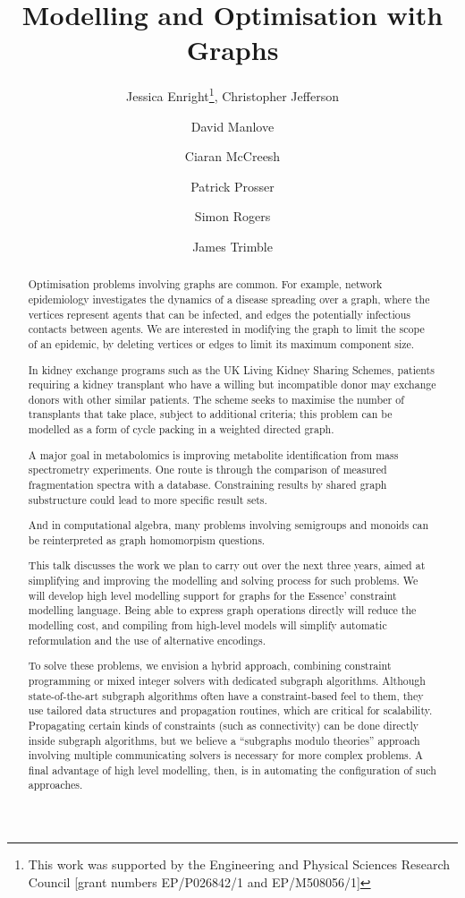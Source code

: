 \documentclass{llncs}
\title{Modelling and Optimisation with Graphs}
\author{
    Jessica Enright\inst{1}\thanks{This work was supported by the Engineering and Physical Sciences
    Research Council [grant numbers EP/P026842/1 and EP/M508056/1]},
    Christopher Jefferson\inst{2}\samethanks[1] \and
    David Manlove\inst{3} \and
    Ciaran McCreesh\inst{3}\samethanks[1] \and
    Patrick Prosser\inst{3}\samethanks[1] \and
    Simon Rogers \inst{3} \and
    James Trimble\inst{3}\samethanks[1]
}
\institute{
    University of Stirling, Stirling, Scotland \and
    University of St Andrews, St Andrews, United Kingdom \and
    University of Glasgow, Glasgow, Scotland}
\begin{document}
\maketitle

\begin{abstract}
    Optimisation problems involving graphs are common. For example, network epidemiology
    investigates the dynamics of a disease spreading over a graph, where the vertices represent
    agents that can be infected, and edges the potentially infectious contacts between agents.  We
    are interested in modifying the graph to limit the scope of an epidemic, by deleting vertices or
    edges to limit its maximum component size.

    In kidney exchange programs such as the UK Living Kidney Sharing Schemes, patients requiring a
    kidney transplant who have a willing but incompatible donor may exchange donors with other
    similar patients. The scheme seeks to maximise the number of transplants that take place,
    subject to additional criteria; this problem can be modelled as a form of cycle packing in a
    weighted directed graph.

    A major goal in metabolomics is improving metabolite identification from mass spectrometry
    experiments. One route is through the comparison of measured fragmentation spectra with a
    database. Constraining results by shared graph substructure could lead to more specific result
    sets.

    And in computational algebra, many problems involving semigroups and monoids can be
    reinterpreted as graph homomorpism questions.

    This talk discusses the work we plan to carry out over the next three years, aimed at
    simplifying and improving the modelling and solving process for such problems.  We will develop
    high level modelling support for graphs for the Essence' constraint modelling language.  Being
    able to express graph operations directly will reduce the modelling cost, and compiling from
    high-level models will simplify automatic reformulation and the use of alternative encodings.

    To solve these problems, we envision a hybrid approach, combining constraint programming or
    mixed integer solvers with dedicated subgraph algorithms. Although state-of-the-art subgraph
    algorithms often have a constraint-based feel to them, they use tailored data structures and
    propagation routines, which are critical for scalability. Propagating certain kinds of
    constraints (such as connectivity) can be done directly inside subgraph algorithms, but we
    believe a ``subgraphs modulo theories'' approach involving multiple communicating solvers is
    necessary for more complex problems. A final advantage of high level modelling, then, is in
    automating the configuration of such approaches.
\end{abstract}
\end{document}
